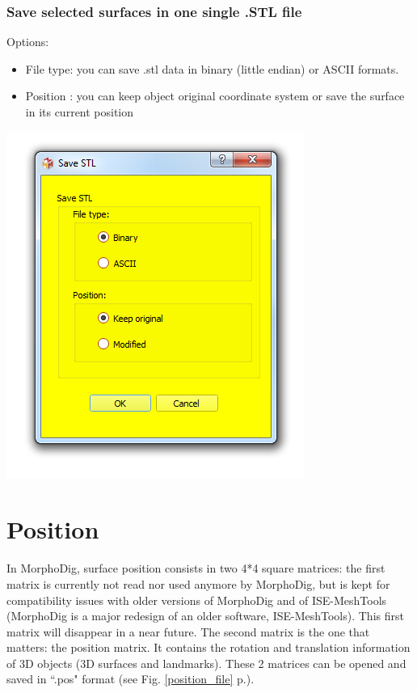 \subsubsection{Save selected surfaces in one single .STL file}

\begin{minipage}{0.5\textwidth}
Options:
\begin{itemize}
\item File type: you can save .stl data in binary (little endian) or
ASCII formats.

\item Position : you can keep object original coordinate system or save the surface in its current position
\end{itemize}

\end{minipage}    
\begin{minipage}{0.5\textwidth}\centering
  \includegraphics[scale=0.5]{images/07/surface/save_stl.png}
 \end{minipage} 




\section{Position}
In MorphoDig, surface position consists in two
4*4 square matrices: the first matrix is currently not read nor used anymore by MorphoDig, but is kept for compatibility issues with older versions of MorphoDig and of ISE-MeshTools (MorphoDig is a major redesign of an older software, ISE-MeshTools). This first matrix will disappear in a near future.  The second matrix is the one that matters: the position matrix. It contains the rotation and translation information of 3D objects (3D surfaces and landmarks). These 2 matrices can be opened and saved in ``.pos" format (see Fig. \ref{position_file} p.\pageref{position_file}).


